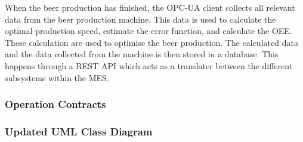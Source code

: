 When the beer production has finished, the OPC-UA client collects all relevant
data from the beer production machine. This data is used to calculate the
optimal production speed, estimate the error function, and calculate the OEE.
These calculation are used to optimise the beer production. The calculated data
and the data collected from the machine is then stored in a database. This
happens through a REST API which acts as a translater between the different 
subsystems within the MES.

\subsubsection{Operation Contracts}

\subsubsection{Updated UML Class Diagram}

